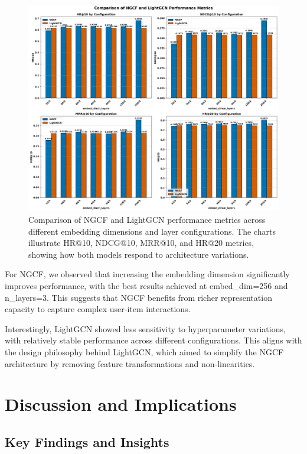 \documentclass[sigconf,nonacm]{acmart} %
\begin{document}
\begin{figure}[t]  
\centering  
\includegraphics[width=\columnwidth]{model_comparison.png}  
\caption{Comparison of NGCF and LightGCN performance metrics across different embedding dimensions and layer configurations. The charts illustrate HR@10, NDCG@10, MRR@10, and HR@20 metrics, showing how both models respond to architecture variations.}  
\label{fig:model-comparison}  
\end{figure}  

For NGCF, we observed that increasing the embedding dimension significantly improves performance, with the best results achieved at embed\_dim=256 and n\_layers=3. This suggests that NGCF benefits from richer representation capacity to capture complex user-item interactions.  

Interestingly, LightGCN showed less sensitivity to hyperparameter variations, with relatively stable performance across different configurations. This aligns with the design philosophy behind LightGCN, which aimed to simplify the NGCF architecture by removing feature transformations and non-linearities.  

\section{Discussion and Implications}  

\subsection{Key Findings and Insights}  
\end{document}
